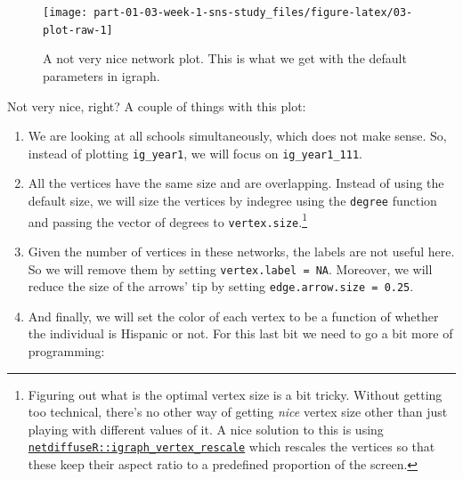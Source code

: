 \documentclass[
]{book}
\newenvironment{Shaded}{\begin{snugshade}}{\end{snugshade}}
\newcommand{\DecValTok}[1]{\textcolor[rgb]{0.00,0.00,0.81}{#1}}
\newcommand{\FunctionTok}[1]{\textcolor[rgb]{0.13,0.29,0.53}{\textbf{#1}}}
\newcommand{\NormalTok}[1]{#1}
\newcommand{\OtherTok}[1]{\textcolor[rgb]{0.56,0.35,0.01}{#1}}
\newcommand{\SpecialCharTok}[1]{\textcolor[rgb]{0.81,0.36,0.00}{\textbf{#1}}}
\newcommand{\StringTok}[1]{\textcolor[rgb]{0.31,0.60,0.02}{#1}}
\begin{document}
\begin{figure}

{\centering \texttt{[image: part-01-03-week-1-sns-study\_files/figure-latex/03-plot-raw-1]} 

}

\caption{A not very nice network plot. This is what we get with the default parameters in igraph.}\label{fig:03-plot-raw}
\end{figure}

Not very nice, right? A couple of things with this plot:

\begin{enumerate}
\def\labelenumi{\arabic{enumi}.}
\item
  We are looking at all schools simultaneously, which does not make sense. So, instead of plotting \texttt{ig\_year1}, we will focus on \texttt{ig\_year1\_111}.
\item
  All the vertices have the same size and are overlapping. Instead of using the default size, we will size the vertices by indegree using the \texttt{degree} function and passing the vector of degrees to \texttt{vertex.size}.\footnote{Figuring out what is the optimal vertex size is a bit tricky. Without getting too technical, there's no other way of getting \emph{nice} vertex size other than just playing with different values of it. A nice solution to this is using \href{https://www.rdocumentation.org/packages/netdiffuseR/versions/1.17.0/topics/rescale_vertex_igraph}{\texttt{netdiffuseR::igraph\_vertex\_rescale}} which rescales the vertices so that these keep their aspect ratio to a predefined proportion of the screen.}
\item
  Given the number of vertices in these networks, the labels are not useful here. So we will remove them by setting \texttt{vertex.label\ =\ NA}. Moreover, we will reduce the size of the arrows' tip by setting \texttt{edge.arrow.size\ =\ 0.25}.
\item
  And finally, we will set the color of each vertex to be a function of whether the individual is Hispanic or not. For this last bit we need to go a bit more of programming:
\end{enumerate}

\begin{Shaded}
\end{Shaded}
\end{document}
